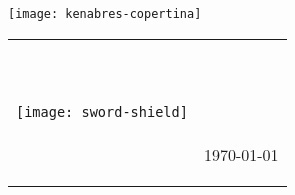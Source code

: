 \begin{titlepage}
\null\vfill
{}
\begin{center}
\large
\sffamily

\bigskip

{\Large\spacedlowsmallcaps{\myName}} \\

\bigskip

{\huge\spacedlowsmallcaps{\myTitle} \\
}

\vspace{2cm}

\texttt{[image: kenabres-copertina]}

\bigskip
    
\vspace{7cm}

\begin{tabular} {cc}
\parbox{0.3\textwidth}{\texttt{[image: sword-shield]}}
&
\parbox{0.7\textwidth}{{\Large\spacedlowsmallcaps{\mySubTitle}} \\ 

					{\normalsize
					
					\myGroup \\
					\myUrl \\
					\myTime\today}}
			\end{tabular}
\end{center}
\vfill
\end{titlepage}



